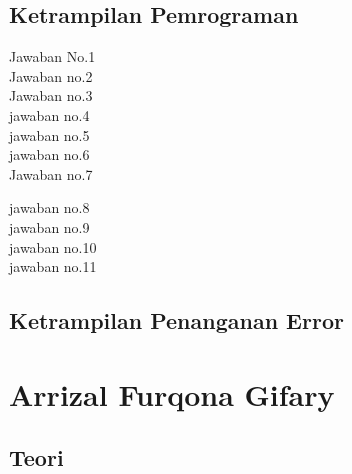 \begin{enumerate}
\subsection{Ketrampilan Pemrograman}
 Jawaban No.1\\

Jawaban no.2\\

Jawaban no.3\\

jawaban no.4\\

jawaban no.5\\

jawaban no.6\\

Jawaban no.7

jawaban no.8\\

jawaban no.9\\

jawaban no.10\\

jawaban no.11\\

\end{enumerate}
\subsection{Ketrampilan Penanganan Error}



\section{Arrizal Furqona Gifary}
\subsection{Teori}

